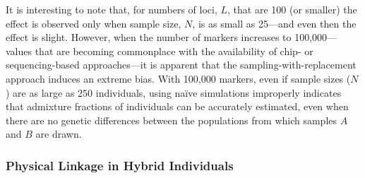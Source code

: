 {\begin{figure}
\begin{center}
\end{center}
\caption[\biassimscap]{\sometimes{\biassimscap}}
\label{fig:bias-sims}
\end{figure}
It is interesting to note
that, for numbers of loci,  $L$, that are 100 (or smaller) the effect is observed only when
sample size, $N$, is as small as 25---and even then the effect is slight.  However, when the
number of markers increases to 100,000---values that are becoming commonplace with the availability of chip-
or sequencing-based approaches---it is apparent that the sampling-with-replacement approach
induces an extreme bias.  With 100,000 markers, even if sample sizes ($N$) are as large as 250 individuals,
using na\"{i}ve simulations improperly indicates that admixture fractions of individuals can be
accurately estimated, even when there are no genetic differences between the populations from which
samples $A$ and $B$ are drawn.

\subsubsection*{Physical Linkage in Hybrid Individuals}

}
